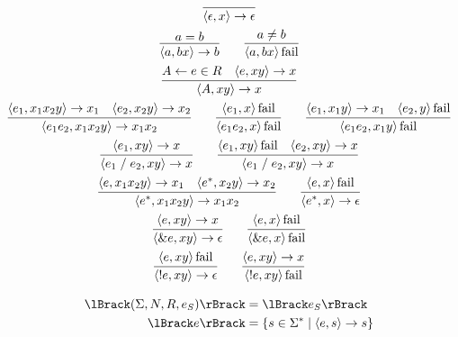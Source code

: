\begin{gather*}
  \infer{\langle \epsilon, x\rangle \to \epsilon}{}
  \\
  \infer{\langle a, bx\rangle \to b}{
    a = b
  }
  \hspace{2em}
  \infer{\langle a, bx\rangle \symfail}{
    a \neq b
  }
  \\
  \infer{\langle A, xy\rangle \to x}{
    A \assign e \in R
    &
    \langle e, xy\rangle \to x
  }
  \\
  \infer{\langle e_1e_2, x_1x_2y\rangle \to x_1x_2}{
    \langle e_1, x_1x_2y\rangle \to x_1
    &
    \langle e_2, x_2y\rangle \to x_2
  }
  \hspace{2em}
  \infer{\langle e_1e_2, x\rangle \symfail}{
    \langle e_1, x\rangle \symfail
  }
  \hspace{2em}
  \infer{\langle e_1e_2, x_1y\rangle \symfail}{
    \langle e_1, x_1y\rangle \to x_1
    &
    \langle e_2, y\rangle \symfail
  }
  \\
  \infer{\langle e_1 \mathrel{/} e_2, xy\rangle \to x}{
    \langle e_1, xy\rangle \to x
  }
  \hspace{2em}
  \infer{\langle e_1 \mathrel{/} e_2, xy\rangle \to x}{
    \langle e_1, xy\rangle \symfail
    &
    \langle e_2, xy\rangle \to x
  }
  \\
  \infer{\langle e^*, x_1x_2y\rangle \to x_1x_2}{
    \langle e, x_1x_2y\rangle \to x_1
    &
    \langle e^*, x_2y\rangle \to x_2
  }
  \hspace{2em}
  \infer{\langle e^*, x\rangle \to \epsilon}{
    \langle e, x\rangle \symfail
  }
  \\
  \infer{\langle \& e, xy\rangle \to \epsilon}{
    \langle e, xy\rangle \to x
  }
  \hspace{2em}
  \infer{\langle \& e, x\rangle \symfail}{
    \langle e, x\rangle \symfail
  }
  \\
  \infer{\langle !e, xy\rangle \to \epsilon}{
    \langle e, xy\rangle \symfail
  }
  \hspace{2em}
  \infer{\langle !e, xy\rangle \symfail}{
    \langle e, xy\rangle \to x
  }
\end{gather*}

\begin{align*}
  \semanticf{(\Sigma, N, R, e_S)} &= \semanticf{e_S} \\
  \semanticf{e} &= \{s \in \Sigma^* \mid \langle e, s\rangle \to s\}
\end{align*}
